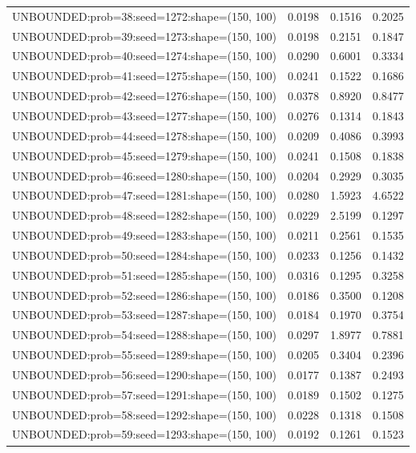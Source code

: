 \begin{longtable}{lccc}
UNBOUNDED:prob=38:seed=1272:shape=(150, 100)  &   0.0198 &  0.1516 &  0.2025 \\
UNBOUNDED:prob=39:seed=1273:shape=(150, 100)  &   0.0198 &  0.2151 &  0.1847 \\
UNBOUNDED:prob=40:seed=1274:shape=(150, 100)  &   0.0290 &  0.6001 &  0.3334 \\
UNBOUNDED:prob=41:seed=1275:shape=(150, 100)  &   0.0241 &  0.1522 &  0.1686 \\
UNBOUNDED:prob=42:seed=1276:shape=(150, 100)  &   0.0378 &  0.8920 &  0.8477 \\
UNBOUNDED:prob=43:seed=1277:shape=(150, 100)  &   0.0276 &  0.1314 &  0.1843 \\
UNBOUNDED:prob=44:seed=1278:shape=(150, 100)  &   0.0209 &  0.4086 &  0.3993 \\
UNBOUNDED:prob=45:seed=1279:shape=(150, 100)  &   0.0241 &  0.1508 &  0.1838 \\
UNBOUNDED:prob=46:seed=1280:shape=(150, 100)  &   0.0204 &  0.2929 &  0.3035 \\
UNBOUNDED:prob=47:seed=1281:shape=(150, 100)  &   0.0280 &  1.5923 &  4.6522 \\
UNBOUNDED:prob=48:seed=1282:shape=(150, 100)  &   0.0229 &  2.5199 &  0.1297 \\
UNBOUNDED:prob=49:seed=1283:shape=(150, 100)  &   0.0211 &  0.2561 &  0.1535 \\
UNBOUNDED:prob=50:seed=1284:shape=(150, 100)  &   0.0233 &  0.1256 &  0.1432 \\
UNBOUNDED:prob=51:seed=1285:shape=(150, 100)  &   0.0316 &  0.1295 &  0.3258 \\
UNBOUNDED:prob=52:seed=1286:shape=(150, 100)  &   0.0186 &  0.3500 &  0.1208 \\
UNBOUNDED:prob=53:seed=1287:shape=(150, 100)  &   0.0184 &  0.1970 &  0.3754 \\
UNBOUNDED:prob=54:seed=1288:shape=(150, 100)  &   0.0297 &  1.8977 &  0.7881 \\
UNBOUNDED:prob=55:seed=1289:shape=(150, 100)  &   0.0205 &  0.3404 &  0.2396 \\
UNBOUNDED:prob=56:seed=1290:shape=(150, 100)  &   0.0177 &  0.1387 &  0.2493 \\
UNBOUNDED:prob=57:seed=1291:shape=(150, 100)  &   0.0189 &  0.1502 &  0.1275 \\
UNBOUNDED:prob=58:seed=1292:shape=(150, 100)  &   0.0228 &  0.1318 &  0.1508 \\
UNBOUNDED:prob=59:seed=1293:shape=(150, 100)  &   0.0192 &  0.1261 &  0.1523 \\

\end{longtable}
